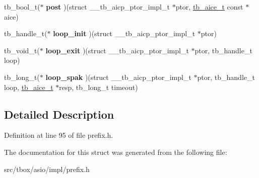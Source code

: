 \begin{DoxyCompactItemize}
\item 
\hypertarget{structtb__aicp__ptor__impl__t_a8ad461ce62eb1355780bafb668965e8f}{tb\-\_\-bool\-\_\-t($\ast$ {\bfseries post} )(struct \-\_\-\-\_\-tb\-\_\-aicp\-\_\-ptor\-\_\-impl\-\_\-t $\ast$ptor, \hyperlink{structtb__aice__t}{tb\-\_\-aice\-\_\-t} const $\ast$aice)}\label{structtb__aicp__ptor__impl__t_a8ad461ce62eb1355780bafb668965e8f}

\item 
\hypertarget{structtb__aicp__ptor__impl__t_ad7a8ec45280848abddb70bd3643fc5de}{tb\-\_\-handle\-\_\-t($\ast$ {\bfseries loop\-\_\-init} )(struct \-\_\-\-\_\-tb\-\_\-aicp\-\_\-ptor\-\_\-impl\-\_\-t $\ast$ptor)}\label{structtb__aicp__ptor__impl__t_ad7a8ec45280848abddb70bd3643fc5de}

\item 
\hypertarget{structtb__aicp__ptor__impl__t_a3b3451345b4c29c007fd7cad90d0654f}{tb\-\_\-void\-\_\-t($\ast$ {\bfseries loop\-\_\-exit} )(struct \-\_\-\-\_\-tb\-\_\-aicp\-\_\-ptor\-\_\-impl\-\_\-t $\ast$ptor, tb\-\_\-handle\-\_\-t loop)}\label{structtb__aicp__ptor__impl__t_a3b3451345b4c29c007fd7cad90d0654f}

\item 
\hypertarget{structtb__aicp__ptor__impl__t_aa4c456dcb0755b3f3c4c86c6e6be651c}{tb\-\_\-long\-\_\-t($\ast$ {\bfseries loop\-\_\-spak} )(struct \-\_\-\-\_\-tb\-\_\-aicp\-\_\-ptor\-\_\-impl\-\_\-t $\ast$ptor, tb\-\_\-handle\-\_\-t loop, \hyperlink{structtb__aice__t}{tb\-\_\-aice\-\_\-t} $\ast$resp, tb\-\_\-long\-\_\-t timeout)}\label{structtb__aicp__ptor__impl__t_aa4c456dcb0755b3f3c4c86c6e6be651c}

\end{DoxyCompactItemize}


\subsection{Detailed Description}


Definition at line 95 of file prefix.\-h.



The documentation for this struct was generated from the following file\-:\begin{DoxyCompactItemize}
\item 
src/tbox/asio/impl/prefix.\-h\end{DoxyCompactItemize}

